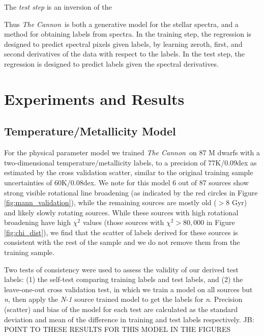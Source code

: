 \documentclass[modern]{aastex62}
\newcommand{\thecannon}{\textsl{The Cannon}}
\begin{document}
The \emph{test step} is an inversion of the 


Thus \thecannon\ is both a generative model for the stellar spectra, and a method for obtaining
labels from spectra. In the training step, the regression is designed to predict spectral pixels
given labels, by learning zeroth, first, and second derivatives of the data with respect to
the labels. In the test step, the regression is designed to predict labels given the spectral
derivatives.

\section{Experiments and Results} \label{sec:results}

\subsection{Temperature/Metallicity Model \label{subsec:mann_results}}
For the physical parameter model we trained \thecannon\ on 87 M dwarfs with a two-dimensional temperature/metallicity labels, to a precision of 77K/0.09dex as estimated by the cross validation scatter, similar to the original training sample uncertainties of 60K/0.08dex. We note for this model 6 out of 87 sources show strong visible rotational line broadening (as indicated by the red circles in Figure \ref{fig:mann_validation}), while the remaining sources are mostly old ($>8$ Gyr) and likely slowly rotating sources. While these sources with high rotational broadening have high $\chi^2$ values (those sources with $\chi^2 > 80,000$ in Figure \ref{fig:chi_dist}), we find that the scatter of labels derived for these sources is consistent with the rest of the sample and we do not remove them from the training sample.

Two tests of consistency were used to assess the validity of our derived test labels: (1) the self-test comparing training labels and test labels, and (2) the leave-one-out cross validation test, in which we train a model on all sources but \emph{n}, then apply the \emph{N-1} source trained model to get the labels for \emph{n}. Precision (scatter) and bias of the model for each test are calculated as the standard deviation and mean of the difference in training and test labels respectively. JB: POINT TO THESE RESULTS FOR THIS MODEL IN THE FIGURES
\end{document}
